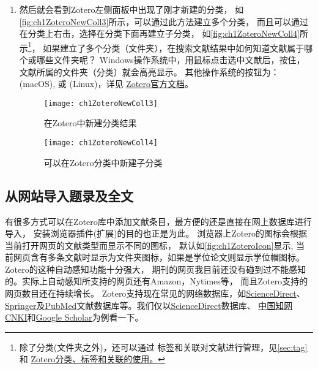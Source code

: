 \documentclass[theorem=false,mathfont=none,openany,sub3section]{easybook}
\begin{document}
\begin{enumerate}
\begin{figure}
	\end{figure}
	\item 
	然后就会看到Zotero左侧面板中出现了刚才新建的分类，
	如\autoref{fig:ch1ZoteroNewColl3}所示，可以通过此方法建立多个分类，
	而且可以通过在分类上右击，选择在分类下面再建立子分类，
	如\autoref{fig:ch1ZoteroNewColl4}所示\footnote{除了分类(文件夹之外)，还可以通过
		标签和关联对文献进行管理，见\cref{sec:tag}和
		\href{https://zhuanlan.zhihu.com/p/275707703}{Zotero分类、标签和关联的使用。}}，
	如果建立了多个分类（文件夹），在搜索文献结果中如何知道文献属于哪个或哪些文件夹呢？
	Windows操作系统中，用鼠标点击选中文献后，按住，文献所属的文件夹（分类）就会高亮显示。
	其他操作系统的按钮为：  (macOS), 或 (Linux)，详见
	\href{https://www.zotero.org/support/collections_and_tags#identifying_collections_an_item_is_in}{Zotero官方文档}。
	
	\begin{figure}[htbp]
		\begin{minipage}[t]{0.4\linewidth}
			\centering
			\texttt{[image: ch1ZoteroNewColl3]}
			\caption{在Zotero中新建分类结果}
			\label{fig:ch1ZoteroNewColl3}
		\end{minipage}
		\begin{minipage}[t]{0.7\linewidth}
			\centering
			\texttt{[image: ch1ZoteroNewColl4]}
			\caption{可以在Zotero分类中新建子分类}
			\label{fig:ch1ZoteroNewColl4}
		\end{minipage}
	\end{figure}
\end{enumerate}
\subsection{从网站导入题录及全文} \label{sec:ImportFromWeb}
有很多方式可以在Zotero库中添加文献条目，最方便的还是直接在网上数据库进行导入，
安装浏览器插件(扩展)的目的也正是为此。
浏览器上Zotero的图标会根据当前打开网页的文献类型而显示不同的图标，
默认如\autoref{fig:ch1ZoteroIcon}显示,
当前网页含有多条文献时显示为文件夹图标，如果是学位论文则显示学位帽图标。
Zotero的这种自动感知功能十分强大，
期刊的网页我目前还没有碰到过不能感知的。实际上自动感知所支持的网页还有Amazon，Nytimes等，
而且Zotero支持的网页数目还在持续增长。
Zotero支持现在常见的网络数据库，如\href{https://www.sciencedirect.com/}{ScienceDirect}、\href{https://link.springer.com/}{Springer}及\href{https://pubmed.ncbi.nlm.nih.gov/}{PubMed}文献数据库等。我们仅以\href{https://www.sciencedirect.com/}{ScienceDirect}数据库、
\href{www.cnki.net}{中国知网CNKI}和\href{https://scholar.google.cz/schhp?hl=zh-CN}{Google Scholar}为例看一下。
\end{document}

